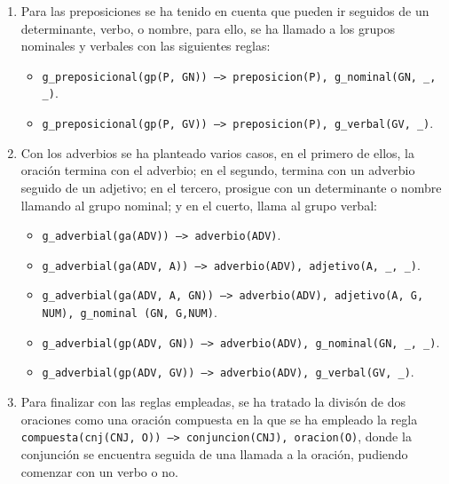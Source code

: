 \documentclass[a4paper]{article}
\begin{document}
\begin{enumerate}
        \item Para las preposiciones se ha tenido en cuenta que pueden ir seguidos de un determinante, verbo, o nombre, para ello, se ha llamado a los grupos nominales y verbales con las siguientes reglas:

            \begin{itemize}

                \item \texttt{g\_preposicional(gp(P, GN)) --> preposicion(P), g\_nominal(GN, \_, \_)}.

                \item \texttt{g\_preposicional(gp(P, GV)) --> preposicion(P), g\_verbal(GV, \_)}.

            \end{itemize}

        \item Con los adverbios se ha planteado varios casos, en el primero de ellos, la oración termina con el adverbio; en el segundo, termina con un adverbio seguido de un adjetivo; en el tercero, prosigue con un determinante o nombre llamando al grupo nominal; y en el cuerto, llama al grupo verbal:

            \begin{itemize}

                \item \texttt{g\_adverbial(ga(ADV)) --> adverbio(ADV)}.

                \item \texttt{g\_adverbial(ga(ADV, A)) --> adverbio(ADV), adjetivo(A, \_, \_)}.

                \item \texttt{g\_adverbial(ga(ADV, A, GN)) --> adverbio(ADV), adjetivo(A, G, NUM), g\_nominal (GN, G,NUM)}.

                \item \texttt{g\_adverbial(gp(ADV, GN)) --> adverbio(ADV), g\_nominal(GN, \_, \_)}.

                \item \texttt{g\_adverbial(gp(ADV, GV)) --> adverbio(ADV), g\_verbal(GV, \_)}.

            \end{itemize}

        \item Para finalizar con las reglas empleadas, se ha tratado la divisón de dos oraciones como una oración compuesta en la que se ha empleado la regla \texttt{compuesta(cnj(CNJ, O)) --> conjuncion(CNJ), oracion(O)}, donde la conjunción se encuentra seguida de una llamada a la oración, pudiendo comenzar con un verbo o no.

    \end{enumerate}
\end{document}
